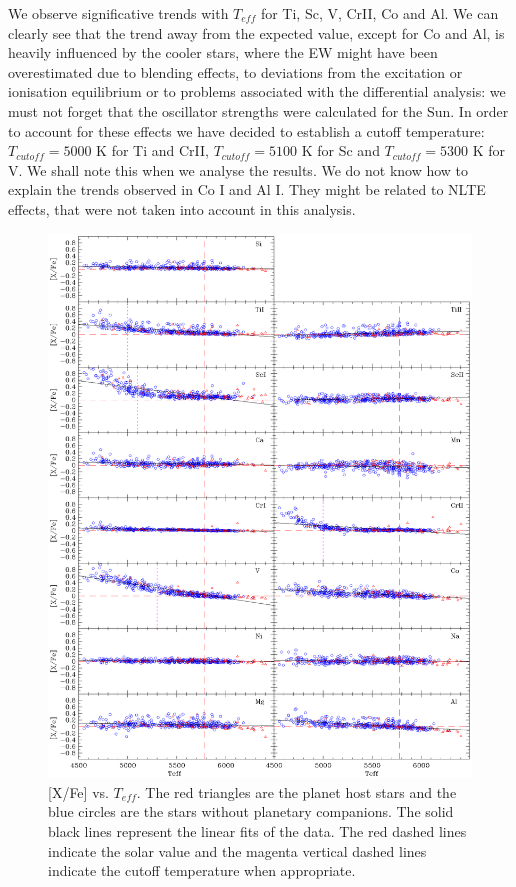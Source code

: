 \documentclass[dvips,12pt,a4paper]{report}
\begin{document}
{{\begin{table}[h]
\begin{tabular}{ c r@{$\pm$}l r@{$\pm$}l | c r@{$\pm$}l r@{$\pm$}l}
\end{tabular}
\label {slopes}
\end{table}

We observe significative trends with $T_{eff}$ for Ti, Sc, V, CrII, Co and Al. We can clearly see that the trend away from the expected value, except for Co and Al, is heavily influenced by the cooler stars, where the EW might have been overestimated due to blending effects, to deviations from the excitation or ionisation equilibrium or to problems associated with the differential analysis: we must not forget that the oscillator strengths were calculated for the Sun. In order to account for these effects we have decided to establish a cutoff temperature: $T_{cutoff}=5000$ K for Ti and CrII, $T_{cutoff}=5100$ K for Sc and $T_{cutoff}=5300$ K for V. We shall note this when we analyse the results. We do not know how to explain the trends observed in Co I and Al I. They might be related to NLTE effects, that were not taken into account in this analysis.

\begin{figure}[h!]
\centering
\includegraphics[trim=0cm 1.5cm 0cm 1cm,clip,width=16cm]{pics/parte3/xfeteff.eps}
\caption[depois]{[X/Fe] vs. $T_{eff}$. The red triangles are the planet host stars and the blue circles are the stars without planetary companions. The solid black lines represent the linear fits of the data. The red dashed lines indicate the solar value and the magenta vertical dashed lines indicate the cutoff temperature when appropriate.}
\label{xfeteff}
\end{figure}

}}
\end{document}
